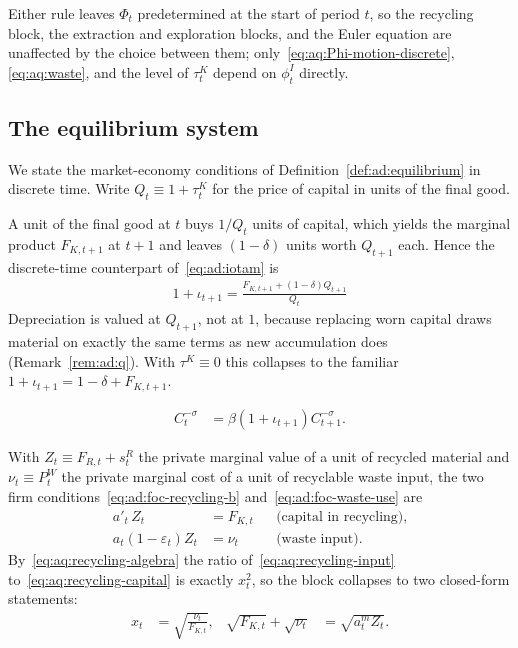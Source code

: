 Either rule leaves $\Phi_t$ predetermined at the start of period $t$, so the recycling block, the extraction and exploration blocks, and the Euler equation are unaffected by the choice between them; only~\eqref{eq:aq:Phi-motion-discrete}, \eqref{eq:aq:waste}, and the level of $\tau^K_t$ depend on $\phi^I_t$ directly.

\subsection{The equilibrium system}
\label{subsec:aq:system}

We state the market-economy conditions of Definition~\ref{def:ad:equilibrium} in discrete time. Write $Q_t\equiv1+\tau^K_t$ for the price of capital in units of the final good.

 A unit of the final good at $t$ buys $1/Q_t$ units of capital, which yields the marginal product $F_{K,t+1}$ at $t+1$ and leaves $\left(1-\delta\right)$ units worth $Q_{t+1}$ each. Hence the discrete-time counterpart of~\eqref{eq:ad:iotam} is
\begin{align}
\boxed{\;1+\iota_{t+1} = \frac{F_{K,t+1}+\left(1-\delta\right)Q_{t+1}}{Q_t}\;}
\label{eq:aq:iota}
\end{align}
Depreciation is valued at $Q_{t+1}$, not at $1$, because replacing worn capital draws material on exactly the same terms as new accumulation does (Remark~\ref{rem:ad:q}). With $\tau^K\equiv0$ this collapses to the familiar $1+\iota_{t+1}=1-\delta+F_{K,t+1}$.

\begin{align}
C_t^{-\sigma} &= \beta\left(1+\iota_{t+1}\right)C_{t+1}^{-\sigma}.
\label{eq:aq:euler}
\end{align}

 With $Z_t\equiv F_{R,t}+s^R_t$ the private marginal value of a unit of recycled material and $\nu_t\equiv P^W_t$ the private marginal cost of a unit of recyclable waste input, the two firm conditions~\eqref{eq:ad:foc-recycling-b} and~\eqref{eq:ad:foc-waste-use} are
\begin{subequations}\label{eq:aq:recycling-block}
\begin{align}
a'_t\,Z_t &= F_{K,t}
&&\text{(capital in recycling)},
\label{eq:aq:recycling-capital}
\\
a_t\left(1-\varepsilon_t\right)Z_t &= \nu_t
&&\text{(waste input)}.
\label{eq:aq:recycling-input}
\end{align}
\end{subequations}
By~\eqref{eq:aq:recycling-algebra} the ratio of~\eqref{eq:aq:recycling-input} to~\eqref{eq:aq:recycling-capital} is exactly $x_t^2$, so the block collapses to two closed-form statements:
\begin{align}
x_t &= \sqrt{\frac{\nu_t}{F_{K,t}}},
&
\sqrt{F_{K,t}}+\sqrt{\nu_t} &= \sqrt{a^m_tZ_t}.
\label{eq:aq:recycling-closed-form}
\end{align}

